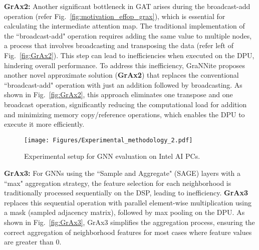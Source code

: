 \textbf{GrAx2:} Another significant bottleneck in GAT arises during the broadcast-add operation (refer Fig.~\ref{fig:motivation_effop_grax}), which is essential for calculating the intermediate attention map. The traditional implementation of the ``broadcast-add" operation requires adding the same value to multiple nodes, a process that involves broadcasting and transposing the data (refer left of Fig.~\ref{fig:GrAx2}). This step can lead to inefficiencies when executed on the DPU, hindering overall performance.
To address this inefficiency, GraNNite proposes another novel approximate solution (\textbf{GrAx2}) that replaces the conventional ``broadcast-add" operation with just an addition followed by broadcasting. As shown in Fig.~\ref{fig:GrAx2}, this approach eliminates one transpose and one broadcast operation, significantly reducing the computational load for addition and minimizing memory copy/reference operations, which enables the DPU to execute it more efficiently.

\begin{figure}[t!]
\begin{center}
\texttt{[image: Figures/Experimental\_methodology\_2.pdf]}%
\end{center}
\caption{Experimental setup for GNN evaluation on Intel AI PCs.}\label{fig:expt_meth}
\end{figure}

\textbf{GrAx3:} For GNNs using the ``Sample and Aggregate" (SAGE) layers with a ``max" aggregation strategy, the feature selection for each neighborhood is traditionally processed sequentially on the DSP, leading to inefficiency. \textbf{GrAx3} replaces this sequential operation with parallel element-wise multiplication using a mask (sampled adjacency matrix), followed by max pooling on the DPU. As shown in Fig.~\ref{fig:GrAx3}, GrAx3 simplifies the aggregation process, ensuring the correct aggregation of neighborhood features for most cases where feature values are greater than 0.


